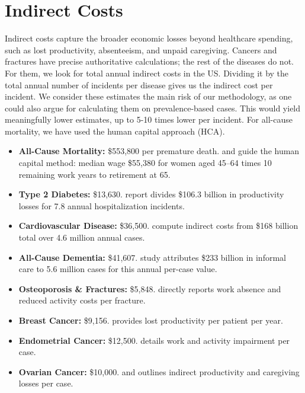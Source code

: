 \documentclass[12pt]{article}
\begin{document}
\section*{Indirect Costs}

Indirect costs capture the broader economic losses beyond healthcare spending, such as lost productivity, absenteeism, and unpaid caregiving. Cancers and fractures have precise authoritative calculations; the rest of the diseases do not. For them, we look for total annual indirect costs in the US. Dividing it by the total annual number of incidents per disease gives us the indirect cost per incident. We consider these estimates the main risk of our methodology, as one could also argue for calculating them on prevalence-based cases. This would yield meaningfully lower estimates, up to 5-10 times lower per incident. For all-cause mortality, we have used the human capital approach (HCA). 

\begin{itemize}
\item \textbf{All-Cause Mortality:} \$553,800 per premature death. \cite{Forbes2024} and \cite{MenniniGitto2022} guide the human capital method: median wage \$55,380 for women aged 45--64 times 10 remaining work years to retirement at 65.
\item \textbf{Type 2 Diabetes:} \$13,630. \cite{Parker2024} report divides \$106.3 billion in productivity losses for 7.8 annual hospitalization incidents.
\item \textbf{Cardiovascular Disease:} \$36,500. \cite{AHA2024} compute indirect costs from \$168 billion total over 4.6 million annual cases.
\item \textbf{All-Cause Dementia:} \$41,607.\cite{Schaeffer2025} study attributes \$233 billion in informal care to 5.6 million cases for this annual per-case value.
\item \textbf{Osteoporosis \& Fractures:} \$5,848. \cite{Mariotto2021} directly reports work absence and reduced activity costs per fracture.
\item \textbf{Breast Cancer:} \$9,156.\cite{ASCO2024} provides lost productivity per patient per year.
\item \textbf{Endometrial Cancer:} \$12,500. \cite{ASCO2024} details work and activity impairment per case.
\item \textbf{Ovarian Cancer:} \$10,000. \cite{Lagan2019} and \cite{CancerTherapyAdvisor2024} outlines indirect productivity and caregiving losses per case.
\end{itemize}
\end{document}
